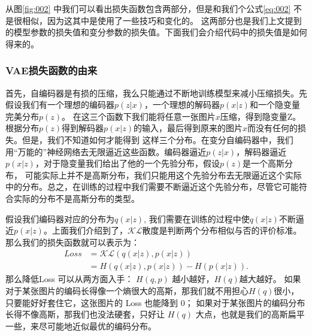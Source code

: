 \documentclass[twocolumn]{article}
\begin{document}
    从图\ref{fig:002} 中我们可以看出损失函数包含两部分，但是和我们个公式\eqref{eq:002} 不是很相似，因为这其中是使用了一些技巧和变化的。
    这两部分也是我们上文提到的模型参数的损失值和变分参数的损失值。下面我们会介绍代码中的损失值是如何得来的。
\subsubsection{VAE损失函数的由来}
    首先，自编码器是有损的压缩，我么只能通过不断地训练模型来减小压缩损失。先假设我们有一个理想的编码器$ p(z|x) $，一个理想的解码器$ p(x|z) $和一个隐变量完美分布$ p(z) $。
    在这三个函数下我们能将任意一张图片$ x $压缩，得到隐变量Z。根据分布$ p(z) $得到解码器$p(x|z) $的输入，最后得到原来的图片$ x $而没有任何的损失。但是，我们不知道如何才能得到
    这样三个分布。在变分自编码器中，我们用“万能的”神经网络去无限逼近这些函数。编码器逼近$ p(z|x) $，解码器逼近$ p(x|z) $，对于隐变量我们给出了他的一个先验分布，假设$ p(z) $是一个高斯分布，
    可能实际上并不是高斯分布，我们只能用这个先验分布去无限逼近这个实际中的分布。总之，在训练的过程中我们需要不断逼近这个先验分布，尽管它可能符合实际的分布不是高斯分布的类型。
    
    假设我们编码器对应的分布为$ q(x|z) $, 我们需要在训练的过程中使$ q(x|z) $不断逼近$ p(x|z) $。上面我们介绍到了，$ \mathcal{KL} $散度是判断两个分布相似与否的评价标准。
    那么我们的损失函数就可以表示为：
\begin{equation}
    \begin{aligned}
        Loss &= \mathcal{KL}(q(x|z), p(x|z)) \\
        &= H(q(x|z), p(x|z)) - H(p(x|z)).
    \end{aligned}
    \label{eq:006}
\end{equation}
    那么降低Loss 可以从两方面入手： $ H(q,p) $ 越小越好，$  H(q)  $越大越好。    
    如果对于某张图片的编码长得像一个熵很大的高斯，那我们就不用担心$  H(q)  $很小，只要能好好套住它，这张图片的 Loss 也能降到 0；
    如果对于某张图片的编码分布长得不像高斯，那我们也没法硬套，只好让 $ H(q) $ 大点，也就是我们的高斯扁平一些，来尽可能地近似最优的编码分布。
    
\end{document}
